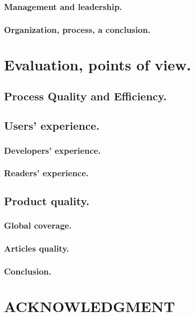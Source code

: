 \documentclass{misqdoc}
\begin{document}
\subsubsection{Management and leadership.}


\subsubsection{Organization, process, a conclusion.}



\section{Evaluation, points of view.}
\label{sec:Evaluation}


\subsection{Process Quality and Efficiency.}
\label{subsec:processquality}


\subsection{Users' experience.}
\label{subsec:usersexperience}


\subsubsection{Developers' experience.}


\subsubsection{Readers' experience.}


\subsection{Product quality.}
\label{subsec:productquality}


\subsubsection{Global coverage.}


\subsubsection{Articles quality.}


\subsubsection{Conclusion.}



\section*{ACKNOWLEDGMENT}%



\end{document}
